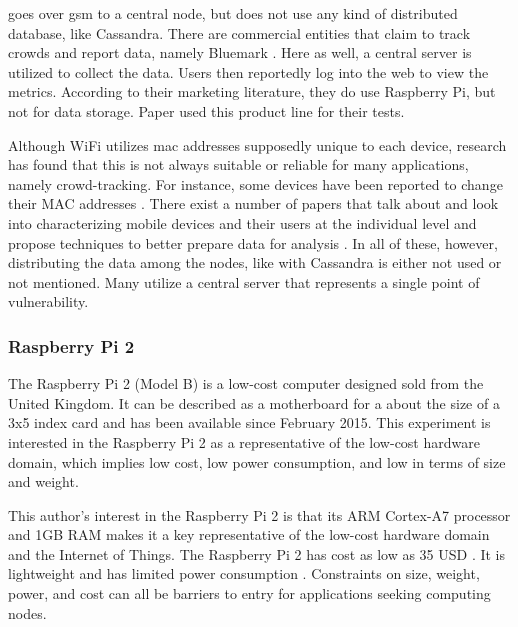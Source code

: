 \cite{Bonne2013WiFiPi:Events} goes over \gls{gsm} to a central node, but does not use any kind of distributed database, like Cassandra.  There are commercial entities that claim to track crowds and report data, namely Bluemark \cite{SchiphorstBlueInnovations}.  Here as well, a central server is utilized to collect the data.
Users then reportedly log into the web to view the metrics.  According to their marketing literature, they do use Raspberry Pi, but not for data storage.
Paper \cite{ChilipireaPresumablyWiFi} used this product line for their tests.

Although WiFi utilizes \gls{mac} addresses supposedly unique to each device, research has found that this is not always suitable or reliable for many applications, namely crowd-tracking.  For instance, some devices have been reported to change their MAC addresses \cite{ChilipireaPresumablyWiFi}.  There exist a number of papers that talk about and look into characterizing mobile devices and their users at the individual level \cite{Pang2007802.Fingerprinting} \cite{Chernyshev2016ServiceChallenges} \cite{Cunche2014LinkingRequests} \cite{Du2016EV-Linker:Matching} \cite{Cunche2012IRequests} \cite{Luzio2016MindRequests} \cite{Musa2012TrackingMonitors} and propose techniques to better prepare data for analysis \cite{ChilipireaPresumablyWiFi}.  In all of these, however, distributing the data among the nodes, like with Cassandra is either not used or not mentioned.  Many utilize a central server that represents a single point of vulnerability.




\subsubsection{Raspberry Pi 2}

The Raspberry Pi 2 (Model B) \cite{RaspberryB} is a low-cost computer designed sold from the United Kingdom.
It can be described as a motherboard for a about the size of a 3x5 index card and has been available since February 2015.
This experiment is interested in the Raspberry Pi 2 as a representative of the low-cost hardware domain, which implies low cost, low power consumption, and low in terms of size and weight.

This author's interest in the Raspberry Pi 2 is that its ARM Cortex-A7 processor and 1GB RAM \cite{RaspberryB} makes it a key representative of the low-cost hardware domain and the Internet of Things.
The Raspberry Pi 2 has cost as low as 35 USD \cite{RaspberryPi}.
It is lightweight and has limited power consumption \cite{RaspberryB}.
Constraints on size, weight, power, and cost can all be barriers to entry for applications seeking computing nodes.

